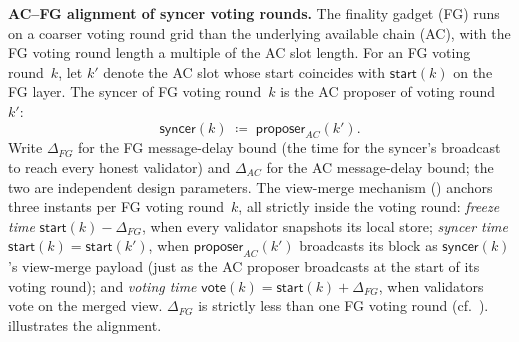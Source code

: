 \ifx\litemode\undefined\documentclass{article}\fi
\newcommand{\start}{\ensuremath{\mathsf{start}}}
\newcommand{\vote}{\ensuremath{\mathsf{vote}}}
\newcommand{\syncer}{\textsf{syncer}\xspace}
\newcommand{\proposer}{\textsf{proposer}\xspace}
\renewcommand{\paragraph}[1]{\vspace{7pt}\noindent\textbf{#1}}
\theoremstyle{plain}
\theoremstyle{definition}
\theoremstyle{remark}
\begin{document}
\paragraph{AC--FG alignment of syncer voting rounds.}
The finality gadget (FG) runs on a coarser voting round grid than the underlying available chain (AC), with the FG voting round length a multiple of the AC slot length.
For an FG voting round~$k$, let $k'$ denote the AC slot whose start coincides with $\start(k)$ on the FG layer.
The syncer of FG voting round~$k$ is the AC proposer of voting round~$k'$:
\[
  \syncer(k) \;\coloneqq\; \proposer_{\mathit{AC}}(k').
\]
Write $\Delta_{\mathit{FG}}$ for the FG message-delay bound (the time for the syncer's broadcast to reach every honest validator) and $\Delta_{\mathit{AC}}$ for the AC message-delay bound; the two are independent design parameters.
The view-merge mechanism () anchors three instants per FG voting round~$k$, all strictly inside the voting round:
\emph{freeze time} $\start(k) - \Delta_{\mathit{FG}}$, when every validator snapshots its local store;
\emph{syncer time} $\start(k) = \start(k')$, when $\proposer_{\mathit{AC}}(k')$ broadcasts its block as $\syncer(k)$'s view-merge payload (just as the AC proposer broadcasts at the start of its voting round);
and \emph{voting time} $\vote(k) = \start(k) + \Delta_{\mathit{FG}}$, when validators vote on the merged view.
$\Delta_{\mathit{FG}}$ is strictly less than one FG voting round (cf.\ ).
 illustrates the alignment.
\end{document}
